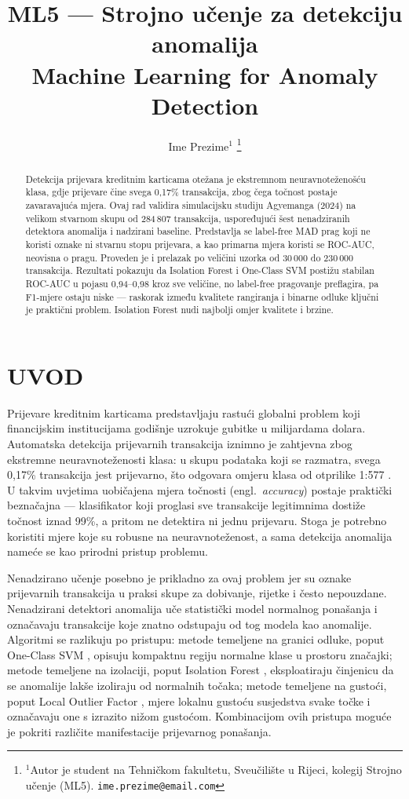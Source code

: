 \documentclass[letterpaper, 10pt, conference]{ieeeconf}
\title{\LARGE \bf ML5 --- Strojno učenje za detekciju anomalija \\[2pt]
\large Machine Learning for Anomaly Detection}
\author{Ime Prezime$^{1}$%
\thanks{$^{1}$Autor je student na Tehničkom fakultetu, Sveučilište u Rijeci,
kolegij Strojno učenje (ML5). {\tt\small ime.prezime@email.com}}%
}
\begin{document}
\maketitle
\thispagestyle{empty}
\pagestyle{empty}

\begin{abstract}
Detekcija prijevara kreditnim karticama otežana je ekstremnom neuravnoteženošću klasa, gdje prijevare čine svega 0,17\% transakcija, zbog čega točnost postaje zavaravajuća mjera. Ovaj rad validira simulacijsku studiju Agyemanga (2024) na velikom stvarnom skupu od 284\,807 transakcija, uspoređujući šest nenadziranih detektora anomalija i nadzirani baseline. Predstavlja se label-free MAD prag koji ne koristi oznake ni stvarnu stopu prijevara, a kao primarna mjera koristi se ROC-AUC, neovisna o pragu. Proveden je i prelazak po veličini uzorka od 30\,000 do 230\,000 transakcija. Rezultati pokazuju da Isolation Forest i One-Class SVM postižu stabilan ROC-AUC u pojasu 0,94--0,98 kroz sve veličine, no label-free pragovanje preflagira, pa F1-mjere ostaju niske --- raskorak između kvalitete rangiranja i binarne odluke ključni je praktični problem. Isolation Forest nudi najbolji omjer kvalitete i brzine.
\end{abstract}

\section{\textbf{UVOD}}
Prijevare kreditnim karticama predstavljaju rastući globalni problem koji financijskim institucijama godišnje uzrokuje gubitke u milijardama dolara. Automatska detekcija prijevarnih transakcija iznimno je zahtjevna zbog ekstremne neuravnoteženosti klasa: u skupu podataka koji se razmatra, svega 0,17\% transakcija jest prijevarno, što odgovara omjeru klasa od otprilike 1:577 \cite{kaggle}. U takvim uvjetima uobičajena mjera točnosti (engl.\ \emph{accuracy}) postaje praktički beznačajna --- klasifikator koji proglasi sve transakcije legitimnima dostiže točnost iznad 99\%, a pritom ne detektira ni jednu prijevaru. Stoga je potrebno koristiti mjere koje su robusne na neuravnoteženost, a sama detekcija anomalija nameće se kao prirodni pristup problemu.

Nenadzirano učenje posebno je prikladno za ovaj problem jer su oznake prijevarnih transakcija u praksi skupe za dobivanje, rijetke i često nepouzdane. Nenadzirani detektori anomalija uče statistički model normalnog ponašanja i označavaju transakcije koje znatno odstupaju od tog modela kao anomalije. Algoritmi se razlikuju po pristupu: metode temeljene na granici odluke, poput One-Class SVM \cite{ocsvm}, opisuju kompaktnu regiju normalne klase u prostoru značajki; metode temeljene na izolaciji, poput Isolation Forest \cite{iforest}, eksploatiraju činjenicu da se anomalije lakše izoliraju od normalnih točaka; metode temeljene na gustoći, poput Local Outlier Factor \cite{lof}, mjere lokalnu gustoću susjedstva svake točke i označavaju one s izrazito nižom gustoćom. Kombinacijom ovih pristupa moguće je pokriti različite manifestacije prijevarnog ponašanja.
\end{document}
